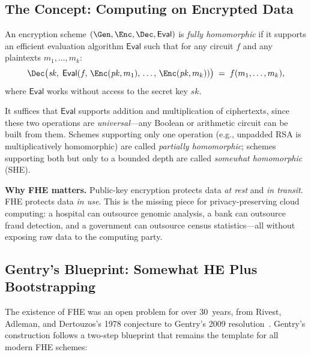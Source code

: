 \subsection{The Concept: Computing on Encrypted Data}
\label{subsec:fhe-concept}

\begin{definition}
\label{def:fhe}
An encryption scheme $(\Gen, \Enc, \Dec, \mathsf{Eval})$ is \emph{fully homomorphic} if it supports an efficient evaluation algorithm $\mathsf{Eval}$ such that for any circuit $f$ and any plaintexts $m_1, \ldots, m_k$:
\begin{equation}
\label{eq:fhe-correctness}
\Dec\bigl(\mathit{sk},\; \mathsf{Eval}(f,\, \Enc(\mathit{pk}, m_1),\, \ldots,\, \Enc(\mathit{pk}, m_k))\bigr) \;=\; f(m_1, \ldots, m_k),
\end{equation}
where $\mathsf{Eval}$ works without access to the secret key $\mathit{sk}$.
\end{definition}

It suffices that $\mathsf{Eval}$ supports addition and multiplication of ciphertexts, since these two operations are \emph{universal}---any Boolean or arithmetic circuit can be built from them.  Schemes supporting only one operation (e.g., unpadded RSA is multiplicatively homomorphic) are called \emph{partially homomorphic}; schemes supporting both but only to a bounded depth are called \emph{somewhat homomorphic} (SHE).

\begin{svgraybox}
\textbf{Why FHE matters.}
Public-key encryption protects data \emph{at rest} and \emph{in transit}.  FHE protects data \emph{in use}.  This is the missing piece for privacy-preserving cloud computing: a hospital can outsource genomic analysis, a bank can outsource fraud detection, and a government can outsource census statistics---all without exposing raw data to the computing party.
\end{svgraybox}


\subsection{Gentry's Blueprint: Somewhat HE Plus Bootstrapping}
\label{subsec:gentry-blueprint}

The existence of FHE was an open problem for over 30~years, from Rivest, Adleman, and Dertouzos's 1978 conjecture to Gentry's 2009 resolution~\cite{Gentry2009}.  Gentry's construction follows a two-step blueprint that remains the template for all modern FHE schemes:

